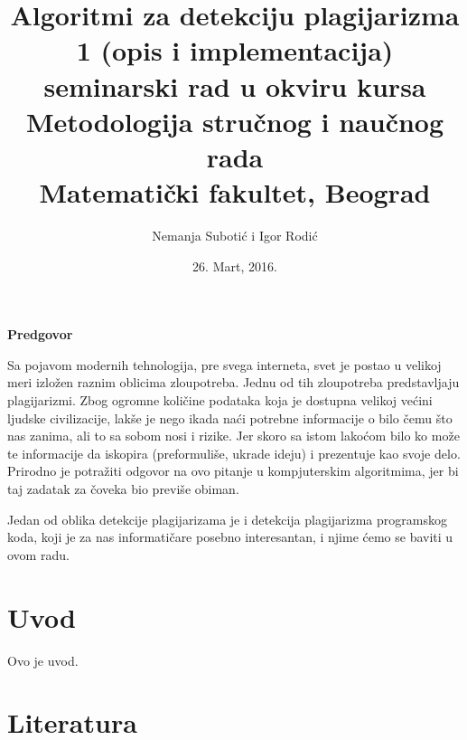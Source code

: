\documentclass[12pt]{article}
\begin{document}
\title{Algoritmi za detekciju plagijarizma 1 (opis i implementacija) \\ \normalsize seminarski rad u okviru kursa Metodologija stručnog i naučnog rada \\ \normalsize Matematički fakultet, Beograd}
\author{Nemanja Subotić i Igor Rodić}
\date{26. Mart, 2016.}
\maketitle

\begin{center}
\textbf{Predgovor}
\end{center}
\par Sa pojavom modernih tehnologija, pre svega interneta, svet je postao u velikoj meri izložen raznim oblicima zloupotreba. Jednu od tih zloupotreba predstavljaju plagijarizmi. Zbog ogromne količine podataka koja je dostupna velikoj većini ljudske civilizacije, lakše je nego ikada naći potrebne informacije o bilo čemu što nas zanima, ali to sa sobom nosi i rizike. Jer skoro sa istom lakoćom bilo ko može te informacije da iskopira (preformuliše, ukrade ideju) i prezentuje kao svoje delo. Prirodno je potražiti odgovor na ovo pitanje u kompjuterskim algoritmima, jer bi taj zadatak za čoveka bio previše obiman. \newline
\par Jedan od oblika detekcije plagijarizama je i detekcija plagijarizma programskog koda, koji je za nas informatičare posebno interesantan, i njime ćemo se baviti u ovom radu.

\renewcommand*\contentsname{Sadržaj}
\tableofcontents
\section{Uvod}
Ovo je uvod.
\section*{Literatura}
\end{document}
